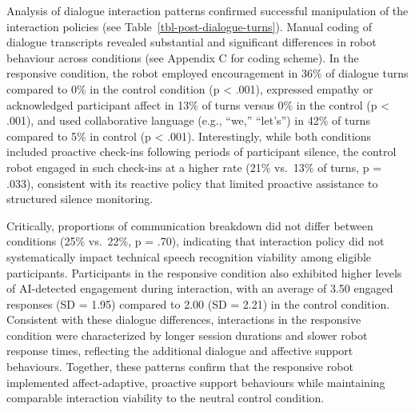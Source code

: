 \documentclass[
  letterpaper,
  DIV=11,
  numbers=noendperiod]{scrartcl}
\begin{document}
Analysis of dialogue interaction patterns confirmed successful
manipulation of the interaction policies (see
Table~\ref{tbl-post-dialogue-turns}). Manual coding of dialogue
transcripts revealed substantial and significant differences in robot
behaviour across conditions (see Appendix C for coding scheme). In the
responsive condition, the robot employed encouragement in 36\% of
dialogue turns compared to 0\% in the control condition (p \textless{}
.001), expressed empathy or acknowledged participant affect in 13\% of
turns versus 0\% in the control (p \textless{} .001), and used
collaborative language (e.g., ``we,'' ``let's'') in 42\% of turns
compared to 5\% in control (p \textless{} .001). Interestingly, while
both conditions included proactive check-ins following periods of
participant silence, the control robot engaged in such check-ins at a
higher rate (21\% vs.~13\% of turns, p = .033), consistent with its
reactive policy that limited proactive assistance to structured silence
monitoring.

Critically, proportions of communication breakdown did not differ
between conditions (25\% vs.~22\%, p = .70), indicating that interaction
policy did not systematically impact technical speech recognition
viability among eligible participants. Participants in the responsive
condition also exhibited higher levels of AI-detected engagement during
interaction, with an average of 3.50 engaged responses (SD = 1.95)
compared to 2.00 (SD = 2.21) in the control condition. Consistent with
these dialogue differences, interactions in the responsive condition
were characterized by longer session durations and slower robot response
times, reflecting the additional dialogue and affective support
behaviours. Together, these patterns confirm that the responsive robot
implemented affect-adaptive, proactive support behaviours while
maintaining comparable interaction viability to the neutral control
condition.
\end{document}
